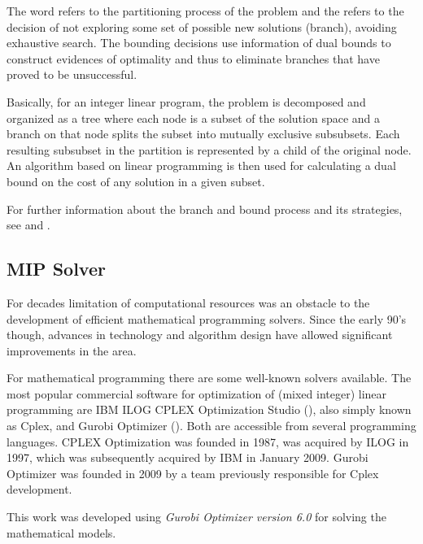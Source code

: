 The  word refers to the partitioning process of the problem and the  refers to the decision of not exploring some set of possible new solutions (branch), avoiding exhaustive search. The bounding decisions use information of dual bounds to construct evidences of optimality and thus to eliminate branches that have proved to be unsuccessful.

Basically, for an integer linear program, the problem is decomposed and organized as a tree where each node is a subset of the solution space and a branch on that node splits the subset into mutually exclusive subsubsets. Each resulting subsubset in the partition is represented by a child of the original node. An algorithm based on linear programming is then used for calculating a dual bound on the cost of any solution in a given subset.

For further information about the branch and bound process and its strategies, see \cite{Wolsey98} and \cite{Papa98}.


\subsection{MIP Solver}

For decades limitation of computational resources was an obstacle to the development of efficient mathematical programming solvers. Since the early 90's though, advances in technology and algorithm design have allowed significant improvements in the area.

For mathematical programming there are some well-known solvers available. The most popular commercial software for optimization of (mixed integer) linear programming are IBM ILOG CPLEX Optimization Studio  (\cite{Cplex}), also simply known as Cplex, and Gurobi Optimizer (\cite{Gurobi}). Both are accessible from several programming languages. CPLEX Optimization was founded in 1987, was acquired by ILOG in 1997, which was subsequently acquired by IBM in January 2009. Gurobi Optimizer was founded in 2009 by a team previously responsible for Cplex development.


This work was developed using \textit{Gurobi Optimizer version 6.0} for solving the mathematical models.





